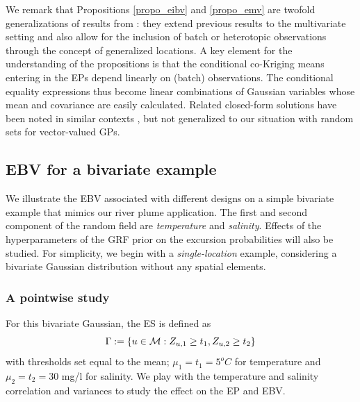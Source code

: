 \documentclass[aoas]{imsart}
\begin{document}
We remark that 
Propositions \ref{propo_eibv} and \ref{propo_emv} are twofold generalizations of  results from \cite{chevalier2014fast}: they extend previous results to the multivariate setting and also allow for the inclusion of batch or heterotopic observations through the concept of generalized locations. 
A key element for the understanding of the propositions is that the conditional co-Kriging means entering in the EPs depend linearly on (batch) observations. The conditional equality expressions thus become linear combinations of Gaussian variables whose mean and covariance are easily calculated. 
Related closed-form solutions have been noted in similar contexts \citep{bhattacharjya2013value,stroh}, but not generalized to our situation with
random sets for vector-valued GPs.

\subsection{EBV for a bivariate example}
\label{Sec:UnivarEx}
We illustrate the EBV associated with different designs on a simple bivariate example that mimics our river plume application. The first and second component of the random field are \textit{temperature} and \textit{salinity}. Effects of the hyperparameters of the GRF prior on the excursion probabilities will also be studied. For simplicity, we begin with a \textit{single-location} example, considering a bivariate Gaussian distribution without any spatial elements.

\subsubsection{A pointwise study}
For this bivariate Gaussian, the ES is defined as
\[
\Gamma := \lbrace u \in \mathcal{M}: Z_{u, 1} \geq t_1, Z_{u, 2}\geq t_2\rbrace
\]
with thresholds set equal to the mean; $\mu_1=t_1=5^o C$ for temperature and  $\mu_2=t_2=30$ mg/l for salinity. We play with the temperature and salinity correlation and variances to study the effect on the EP and EBV.
\end{document}
